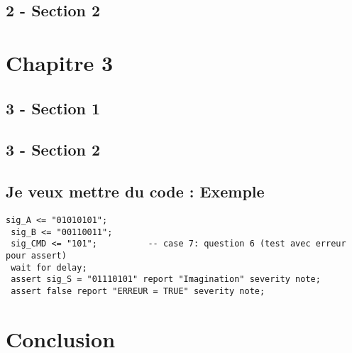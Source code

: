 \documentclass[11pt,a4paper]{report}
\begin{document}
\section{2 - Section 2}

\chapter{Chapitre 3}

\section{3 - Section 1}

\section{3 - Section 2}

\section{Je veux mettre du code : Exemple}

\begin{lstlisting}[label=un-label,caption=Titre du code : ex VHDL ]
 sig_A <= "01010101";
 sig_B <= "00110011";		 
 sig_CMD <= "101";			-- case 7: question 6 (test avec erreur pour assert)		   
 wait for delay;
 assert sig_S = "01110101" report "Imagination" severity note;
 assert false report "ERREUR = TRUE" severity note;
\end{lstlisting}


\chapter*{Conclusion}



%

\end{document}

